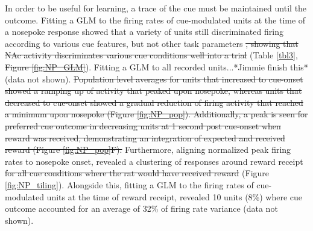 \documentclass[11pt]{article}
\providecommand{\DIFadd}[1]{{\protect\color{blue}\uwave{#1}}} %
\providecommand{\DIFdel}[1]{{\protect\color{red}\sout{#1}}}                      %
\providecommand{\DIFaddbegin}{} %
\providecommand{\DIFaddend}{} %
\providecommand{\DIFdelbegin}{} %
\providecommand{\DIFdelend}{} %
\newcommand{\DIFscaledelfig}{0.5}
\newlength{\DIFdelgraphicswidth} %
\newlength{\DIFdelgraphicsheight} %
\newcommand{\DIFaddincludegraphics}[2][]{{\color{blue}\fbox{\DIFOincludegraphics[#1]{#2}}}} %
\newcommand{\DIFdelincludegraphics}[2][]{%
\sbox{\DIFdelgraphicsbox}{\DIFOincludegraphics[#1]{#2}}%
\settoboxwidth{\DIFdelgraphicswidth}{\DIFdelgraphicsbox} %
\settoboxtotalheight{\DIFdelgraphicsheight}{\DIFdelgraphicsbox} %
\scalebox{\DIFscaledelfig}{%
\parbox[b]{\DIFdelgraphicswidth}{\usebox{\DIFdelgraphicsbox}\\[-\baselineskip] \rule{\DIFdelgraphicswidth}{0em}}\llap{\resizebox{\DIFdelgraphicswidth}{\DIFdelgraphicsheight}{%
\setlength{\unitlength}{\DIFdelgraphicswidth}%
\begin{picture}(1,1)%
\thicklines\linethickness{2pt} %
{\color[rgb]{1,0,0}\put(0,0){\framebox(1,1){}}}%
{\color[rgb]{1,0,0}\put(0,0){\line( 1,1){1}}}%
{\color[rgb]{1,0,0}\put(0,1){\line(1,-1){1}}}%
\end{picture}%
}\hspace*{3pt}}} %
} %
\DeclareRobustCommand{\DIFaddbegin}{\DIFOaddbegin \let\includegraphics\DIFaddincludegraphics} %
\DeclareRobustCommand{\DIFaddend}{\DIFOaddend \let\includegraphics\DIFOincludegraphics} %
\DeclareRobustCommand{\DIFdelbegin}{\DIFOdelbegin \let\includegraphics\DIFdelincludegraphics} %
\DeclareRobustCommand{\DIFdelend}{\DIFOaddend \let\includegraphics\DIFOincludegraphics} %
\begin{document}
In order to be useful for learning, a trace of the cue must be maintained until the outcome. Fitting a GLM to the firing rates of cue-modulated units at the time of a nosepoke response showed that a variety of units still discriminated firing according to various cue features, but not other task parameters \DIFdelbegin \DIFdel{, showing that NAc activity discriminates various cue conditions well into a trial }\DIFdelend (Table \ref{tbl3}, \DIFdelbegin \DIFdel{Figure \ref{fig:NP_GLM}}\DIFdelend \DIFaddbegin \DIFadd{Figures \ref{fig:NP_GLM}, \ref{fig:NP_pop}}\DIFaddend ). Fitting a GLM to all recorded units...*Jimmie finish this* (data not shown). \DIFdelbegin \DIFdel{Population level averages for units that increased to cue-onset showed a ramping up of activity that peaked upon nosepoke, whereas units that decreased to cue-onset showed a gradual reduction of firing activity that reached a minimum upon nosepoke (Figure \ref{fig:NP_pop}). Additionally, a peak is seen for preferred cue outcome in decreasing units at 1 second post cue-onset when reward was received, demonstrating an integration of expected and received reward (Figure \ref{fig:NP_pop}F). }\DIFdelend Furthermore, aligning normalized peak firing rates to nosepoke onset, revealed a clustering of responses around reward receipt \DIFdelbegin \DIFdel{for all cue conditions where the rat would have received reward }\DIFdelend (Figure \ref{fig:NP_tiling}). Alongside this, fitting a GLM to the firing rates of cue-modulated units at the time of reward receipt, revealed 10 units (8\%) where cue outcome accounted for an average of 32\% of firing rate variance (data not shown). 
\end{document}
